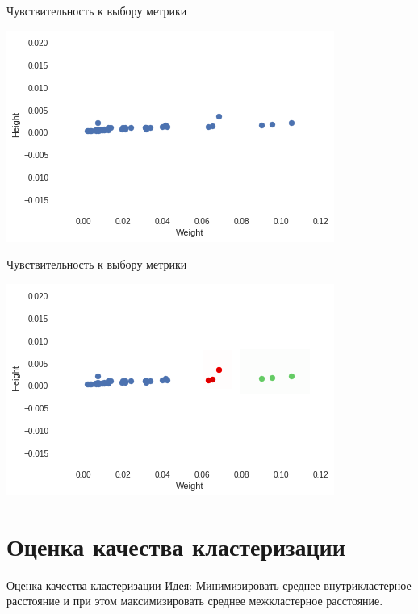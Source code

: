 \documentclass[10pt]{beamer}
\begin{document}
\begin{frame}{Чувствительность к выбору метрики}
	\begin{center}
	  \includegraphics[height=0.8 \textheight, keepaspectratio = true]{images/weight_height3}  
	\end{center}
\end{frame}

\begin{frame}{Чувствительность к выбору метрики}
	\begin{center}
	  \includegraphics[height=0.8 \textheight, keepaspectratio = true]{images/weight_height4}  
	\end{center}
\end{frame}

\section{Оценка качества кластеризации}

\begin{frame}{Оценка качества кластеризации}
  \alert{Идея}: Минимизировать среднее внутрикластерное расстояние и при этом максимизировать среднее межкластерное расстояние.
\end{frame}
\end{document}
